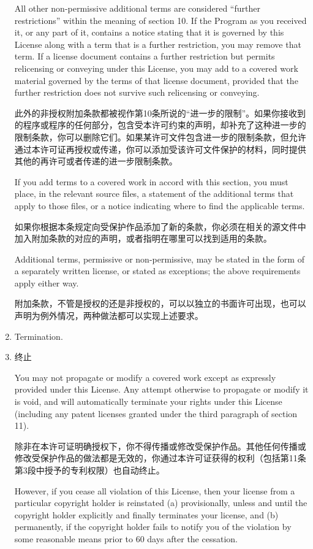 \documentclass[11pt]{article}
\begin{document}
\begin{enumerate}
All other non-permissive additional terms are considered ``further
restrictions'' within the meaning of section 10.  If the Program as you
received it, or any part of it, contains a notice stating that it is
governed by this License along with a term that is a further
restriction, you may remove that term.  If a license document contains
a further restriction but permits relicensing or conveying under this
License, you may add to a covered work material governed by the terms
of that license document, provided that the further restriction does
not survive such relicensing or conveying.

此外的非授权附加条款都被视作第10条所说的“进一步的限制”。如果你接收到的程序或程序的任何部分，包含受本许可约束的声明，却补充了这种进一步的限制条款，你可以删除它们。如果某许可文件包含进一步的限制条款，但允许通过本许可证再授权或传递，你可以添加受该许可文件保护的材料，同时提供其他的再许可或者传递的进一步限制条款。

If you add terms to a covered work in accord with this section, you
must place, in the relevant source files, a statement of the
additional terms that apply to those files, or a notice indicating
where to find the applicable terms.

如果你根据本条规定向受保护作品添加了新的条款，你必须在相关的源文件中加入附加条款的对应的声明，或者指明在哪里可以找到适用的条款。

Additional terms, permissive or non-permissive, may be stated in the
form of a separately written license, or stated as exceptions;
the above requirements apply either way.

附加条款，不管是授权的还是非授权的，可以以独立的书面许可出现，也可以声明为例外情况，两种做法都可以实现上述要求。

\item Termination.
\item 终止

You may not propagate or modify a covered work except as expressly
provided under this License.  Any attempt otherwise to propagate or
modify it is void, and will automatically terminate your rights under
this License (including any patent licenses granted under the third
paragraph of section 11).

除非在本许可证明确授权下，你不得传播或修改受保护作品。其他任何传播或修改受保护作品的做法都是无效的，你通过本许可证获得的权利（包括第11条第3段中授予的专利权限）也自动终止。

However, if you cease all violation of this License, then your
license from a particular copyright holder is reinstated (a)
provisionally, unless and until the copyright holder explicitly and
finally terminates your license, and (b) permanently, if the copyright
holder fails to notify you of the violation by some reasonable means
prior to 60 days after the cessation.


\end{enumerate}
\end{document}
